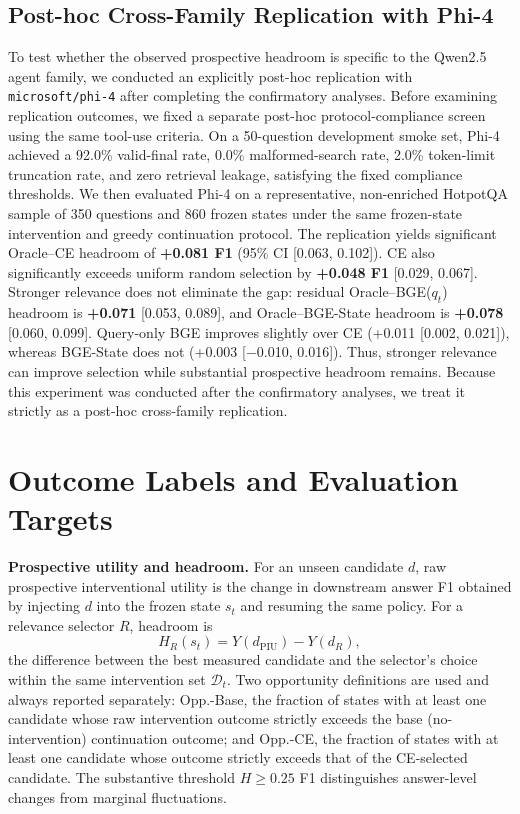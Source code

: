 \documentclass[10pt]{article}
\newcommand{\stitle}[1]{\vspace{0.4em}\noindent\textbf{#1}\hspace{0.6em}}
\begin{document}
\subsection{Post-hoc Cross-Family Replication with Phi-4}
\label{sec:phi4}

To test whether the observed prospective headroom is specific to the
Qwen2.5 agent family, we conducted an explicitly post-hoc replication with
\texttt{microsoft/phi-4} after completing the confirmatory analyses. Before
examining replication outcomes, we fixed a separate post-hoc
protocol-compliance screen using the same tool-use criteria. On a
50-question development smoke set, Phi-4 achieved a 92.0\% valid-final
rate, 0.0\% malformed-search rate, 2.0\% token-limit truncation rate, and
zero retrieval leakage, satisfying the fixed compliance thresholds. We then
evaluated Phi-4 on a representative, non-enriched HotpotQA sample of 350
questions and 860 frozen states under the same frozen-state intervention and
greedy continuation protocol. The replication yields significant
Oracle--CE headroom of \textbf{+0.081 F1} (95\% CI [0.063, 0.102]). CE also
significantly exceeds uniform random selection by \textbf{+0.048 F1}
[0.029, 0.067]. Stronger relevance does not eliminate the gap: residual
Oracle--BGE($q_t$) headroom is \textbf{+0.071} [0.053, 0.089], and
Oracle--BGE-State headroom is \textbf{+0.078} [0.060, 0.099]. Query-only
BGE improves slightly over CE (+0.011 [0.002, 0.021]), whereas BGE-State
does not (+0.003 [$-$0.010, 0.016]). Thus, stronger relevance can improve
selection while substantial prospective headroom remains. Because this
experiment was conducted after the confirmatory analyses, we treat it
strictly as a post-hoc cross-family replication.

\section{Outcome Labels and Evaluation Targets}
\label{sec:labels}

\stitle{Prospective utility and headroom.}
For an unseen candidate $d$, raw prospective interventional utility is the
change in downstream answer F1 obtained by injecting $d$ into the frozen
state $s_t$ and resuming the same policy. For a relevance selector $R$,
headroom is
\begin{equation}
H_R(s_t) = Y(d_{\mathrm{PIU}}) - Y(d_R),
\label{eq:headroom}
\end{equation}
the difference between the best measured candidate and the selector's choice
within the same intervention set $\mathcal{D}_t$. Two opportunity
definitions are used and always reported separately: Opp.-Base, the fraction
of states with at least one candidate whose raw intervention outcome
strictly exceeds the base (no-intervention) continuation outcome; and
Opp.-CE, the fraction of states with at least one candidate whose outcome
strictly exceeds that of the CE-selected candidate. The substantive
threshold $H\ge0.25$ F1 distinguishes answer-level changes from marginal
fluctuations.
\end{document}
